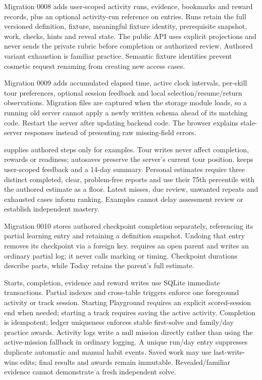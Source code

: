 Migration 0008 adds user-scoped activity runs, evidence, bookmarks and reward
records, plus an optional activity-run reference on entries. Runs retain the full
versioned definition, fixture, meaningful fixture identity, prerequisite snapshot,
work, checks, hints and reveal state. The public API uses explicit projections and
never sends the private rubric before completion or authorized review. Authored
variant exhaustion is familiar practice. Semantic fixture identities prevent
cosmetic request renaming from creating new access cases.

Migration 0009 adds accumulated elapsed time, active clock intervals, per-skill
tour preferences, optional session feedback and local selection/resume/return
observations. Migration files are captured when the storage module loads, so a
running old server cannot apply a newly written schema ahead of its matching code.
Restart the server after updating backend code. The browser explains stale-server
responses instead of presenting raw missing-field errors.

 supplies authored steps only for examples.
Tour writes never affect completion, rewards or readiness; autosaves preserve the
server's current tour position.  keeps user-scoped
feedback and a 14-day summary. Personal estimates require three distinct completed,
clear, problem-free reports and use their 75th percentile with the authored estimate
as a floor. Latest misses, due review, unwanted repeats and exhausted cases inform
ranking. Examples cannot delay assessment review or establish independent mastery.

Migration 0010 stores authored checkpoint completion separately, referencing its
partial learning entry and retaining a definition snapshot. Undoing that entry
removes its checkpoint via a foreign key.  requires an
open parent and writes an ordinary partial log; it never calls marking or timing.
Checkpoint durations describe parts, while Today retains the parent's full estimate.

Starts, completion, evidence and reward writes use SQLite immediate transactions.
Partial indexes and cross-table triggers enforce one foreground activity or track
session. Starting Playground requires an explicit scored-session end when needed;
starting a track requires saving the active activity. Completion is idempotent;
ledger uniqueness enforces stable first-solve and family/day practice awards.
Activity logs write a null mission directly rather than using the active-mission
fallback in ordinary logging. A unique run/day entry suppresses duplicate automatic
and manual habit events. Saved work may use last-write-wins edits; final results and
awards remain immutable. Revealed/familiar evidence cannot demonstrate a fresh
independent solve.

